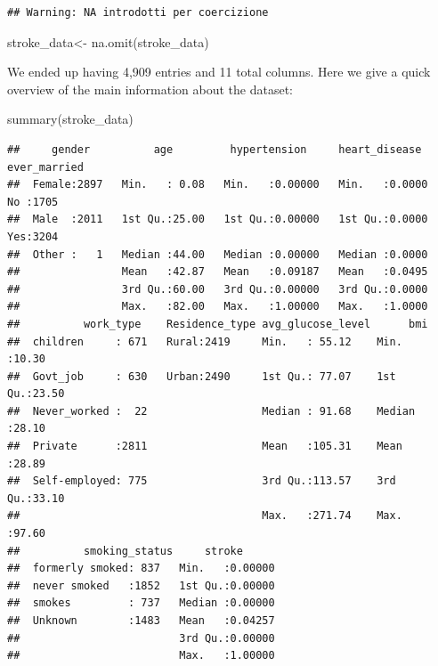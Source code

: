 \documentclass[
]{article}
\newenvironment{Shaded}{\begin{snugshade}}{\end{snugshade}}
\newcommand{\FunctionTok}[1]{\textcolor[rgb]{0.00,0.00,0.00}{#1}}
\newcommand{\NormalTok}[1]{#1}
\newcommand{\OtherTok}[1]{\textcolor[rgb]{0.56,0.35,0.01}{#1}}
\newcommand{\SpecialCharTok}[1]{\textcolor[rgb]{0.00,0.00,0.00}{#1}}
\begin{document}
\begin{Shaded}
\end{Shaded}

\begin{verbatim}
## Warning: NA introdotti per coercizione
\end{verbatim}

\begin{Shaded}
\begin{Highlighting}[]
\NormalTok{stroke\_data}\OtherTok{\textless{}{-}} \FunctionTok{na.omit}\NormalTok{(stroke\_data)}
\end{Highlighting}
\end{Shaded}

We ended up having 4,909 entries and 11 total columns. Here we give a
quick overview of the main information about the dataset:

\begin{Shaded}
\begin{Highlighting}[]
\FunctionTok{summary}\NormalTok{(stroke\_data)}
\end{Highlighting}
\end{Shaded}

\begin{verbatim}
##     gender          age         hypertension     heart_disease    ever_married
##  Female:2897   Min.   : 0.08   Min.   :0.00000   Min.   :0.0000   No :1705    
##  Male  :2011   1st Qu.:25.00   1st Qu.:0.00000   1st Qu.:0.0000   Yes:3204    
##  Other :   1   Median :44.00   Median :0.00000   Median :0.0000               
##                Mean   :42.87   Mean   :0.09187   Mean   :0.0495               
##                3rd Qu.:60.00   3rd Qu.:0.00000   3rd Qu.:0.0000               
##                Max.   :82.00   Max.   :1.00000   Max.   :1.0000               
##          work_type    Residence_type avg_glucose_level      bmi       
##  children     : 671   Rural:2419     Min.   : 55.12    Min.   :10.30  
##  Govt_job     : 630   Urban:2490     1st Qu.: 77.07    1st Qu.:23.50  
##  Never_worked :  22                  Median : 91.68    Median :28.10  
##  Private      :2811                  Mean   :105.31    Mean   :28.89  
##  Self-employed: 775                  3rd Qu.:113.57    3rd Qu.:33.10  
##                                      Max.   :271.74    Max.   :97.60  
##          smoking_status     stroke       
##  formerly smoked: 837   Min.   :0.00000  
##  never smoked   :1852   1st Qu.:0.00000  
##  smokes         : 737   Median :0.00000  
##  Unknown        :1483   Mean   :0.04257  
##                         3rd Qu.:0.00000  
##                         Max.   :1.00000
\end{verbatim}
\end{document}
